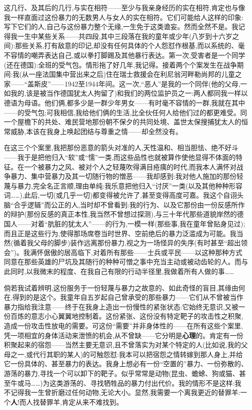 \dmark{}这几行、及其后的几行,与实在相符——至少与我亲身经历的实在相符,肯定也与像我一样直面过这份暴力的无数男人与女人的实在相符。它们可能给人这样的印象:写下它们的人,自己与这份暴力整个无缘,一生免于这类谵妄。然而全然不是。我记得我一生中某些关系——共四段,其中三段落在我的童年或少年(八岁到十六岁之间):那些关系,打有敌意的印记,却没有任何具体的个人怨怼作根基,而以系统的、毫不容情的嘲弄表达自己,或以拳打脚踢及其他暴行表达。第一次,受害者是一个同学(还在德国):全班的受气包。情形拖了好几年,我记得。接着两个个案发生在战争期间:我(从一座法国集中营出来之后)住在瑞士救援会在利尼翁河畔勒尚邦的儿童之家——“盖斯皮”——1942至1944年间。这一次,“恶人”是我的一个同伴(他的父母,一如我的,该是被当作德国犹太人拘留了)和我们的两位监护员之一:两人都同我一样以德语为母语。他们俩,都多少是一群少年男女——有时毫不容情的一群,我就在其中——的受气包;可我相信,我给他们俩的生活,比全伙任何人给他们过的都更难受。同一个屋檐下的共处、难民营地那份朝不保夕的共同处境、盖世太保搜捕犹太人的恒常威胁,本该在我身上唤起团结与尊重之情——却全然没有。

在这三个个案里,我把那份恶意的箭头对准的人,天性温和、相当胆怯、绝不好斗——我于是把他归入“软”或“懦”一类,而这些品性也就被算作使他显得不体面的特征。在一个被暴力之风、被对个人之轻蔑吹得满目疮痍的时代,而我本人满怀对战争暴力、集中营暴力及其一切随行物的憎恶——我却感到:我对他人施加的那份轻蔑与暴力,完全名正言顺,理由单纯:我乐意把他归入“讨厌”一类(以及其他种种形容词……),此后,一切(或几乎一切)都变得被允许了,甚至变得高度可嘉。我这个自诩头脑“合乎逻辑”而公正的人,\dmark{}当时却不曾看到:我的行为、以及它那份由一份反感所作的辩护(那份反感的真正本性,我当然不曾想过探测),与三十年代那些道貌岸然的德国人——对着“肮脏的犹太人”——的行为,一模一样(那些事,我在童年曾贴身见过);而且正是这些行为,使得那场席卷当时世界、空前绝后的暴力泛滥成为可能。我当然(循着我父母的脚步)装作远离那份暴力,视之为一场怪异的失序(有时甚至“超出领会”)。我满怀倨傲的居高临下,对着所有那些——士兵或平民——以这种那种方式同意在那些英雄的尸坑及其随行的种种可憎之事中充当主动或被动齿轮的人。而与此同时,以我微末的程度、在我自己有限的行动半径里,我做着所有人做的事……

倘若我试着辨明,这份服务于一份轻蔑与暴力之故意的、如此奇怪的盲目,其缘由何在,得到的是这个。我童年自五岁起自己曾承受的那些暴力——它们从不曾被当作暴力指给我注意——终于在我身上造出一份慢性的紧张状态:它始终无意识,又被一份百炼的意志小心翼翼地控制着。这份紧张、这份没有特定靶子的攻击性之积聚,造成一份攻击性放电的需要。可这份“需要”并非身体性的——在所有这些个案里,凭一项相宜的身体活动来泄愤的机会,从不曾缺——它分明是\textbf{心理}的。肯定有一份积聚起来的宿怨——当然主要无意识,且不曾落实为对某个特定的人(比如说,我的父母之一,或代行其职的某人)的可触怨怼:我本可以把宿怨之情转嫁到那人身上,并给它一份具体的、甚至暴力的表达。我身上想必有一份“空置的”暴力、一份弥散的、游荡的暴力,寻找一个可以卸下的靶子。似乎常常是动物(昆虫、蟾蜍、狗或猫、甚至牛或马……)为这类游荡的、寻找牺牲品的暴力付出代价。我的情形不是这样:我不记得我一生曾折磨过任何动物,无论大小。显然,我需要一个离我更近的替罪羊:一个\textbf{人}!而人找替罪羊,肯定从来不难找到。

